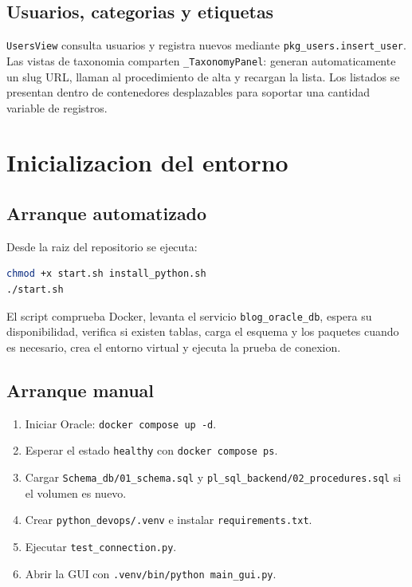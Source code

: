 \documentclass[12pt,a4paper]{article}
\begin{document}
\subsection{Usuarios, categorias y etiquetas}

\texttt{UsersView} consulta usuarios y registra nuevos mediante
\texttt{pkg\_users.insert\_user}. Las vistas de taxonomia comparten
\texttt{\_TaxonomyPanel}: generan automaticamente un slug URL, llaman al
procedimiento de alta y recargan la lista. Los listados se presentan dentro de
contenedores desplazables para soportar una cantidad variable de registros.

\section{Inicializacion del entorno}

\subsection{Arranque automatizado}

Desde la raiz del repositorio se ejecuta:

\begin{lstlisting}[language=bash]
chmod +x start.sh install_python.sh
./start.sh
\end{lstlisting}

El script comprueba Docker, levanta el servicio \texttt{blog\_oracle\_db},
espera su disponibilidad, verifica si existen tablas, carga el esquema y los
paquetes cuando es necesario, crea el entorno virtual y ejecuta la prueba de
conexion.

\subsection{Arranque manual}

\begin{enumerate}
    \item Iniciar Oracle: \texttt{docker compose up -d}.
    \item Esperar el estado \texttt{healthy} con \texttt{docker compose ps}.
    \item Cargar \texttt{Schema\_db/01\_schema.sql} y
    \texttt{pl\_sql\_backend/02\_procedures.sql} si el volumen es nuevo.
    \item Crear \texttt{python\_devops/.venv} e instalar
    \texttt{requirements.txt}.
    \item Ejecutar \texttt{test\_connection.py}.
    \item Abrir la GUI con \texttt{.venv/bin/python main\_gui.py}.
\end{enumerate}
\end{document}
